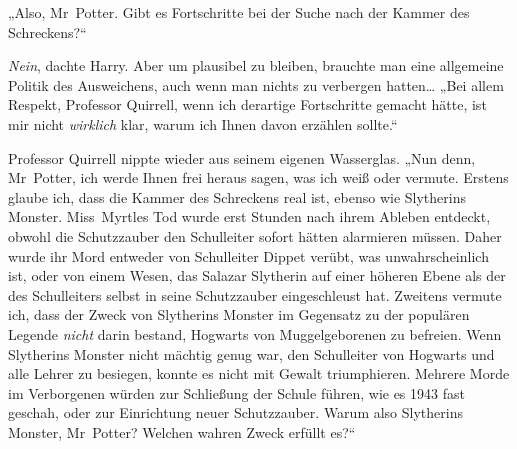 „Also, Mr~Potter. Gibt es Fortschritte bei der Suche nach der Kammer des Schreckens?“

\emph{Nein}, dachte Harry. Aber um plausibel zu bleiben, brauchte man eine allgemeine Politik des Ausweichens, auch wenn man nichts zu verbergen hatten… „Bei allem Respekt, Professor Quirrell, wenn ich derartige Fortschritte gemacht hätte, ist mir nicht \emph{wirklich} klar, warum ich Ihnen davon erzählen sollte.“

Professor Quirrell nippte wieder aus seinem eigenen Wasserglas. „Nun denn, Mr~Potter, ich werde Ihnen frei heraus sagen, was ich weiß oder vermute. Erstens glaube ich, dass die Kammer des Schreckens real ist, ebenso wie Slytherins Monster. Miss~Myrtles Tod wurde erst Stunden nach ihrem Ableben entdeckt, obwohl die Schutzzauber den Schulleiter sofort hätten alarmieren müssen. Daher wurde ihr Mord entweder von Schulleiter Dippet verübt, was unwahrscheinlich ist, oder von einem Wesen, das Salazar Slytherin auf einer höheren Ebene als der des Schulleiters selbst in seine Schutzzauber eingeschleust hat. Zweitens vermute ich, dass der Zweck von Slytherins Monster im Gegensatz zu der populären Legende \emph{nicht} darin bestand, Hogwarts von Muggelgeborenen zu befreien. Wenn Slytherins Monster nicht mächtig genug war, den Schulleiter von Hogwarts und alle Lehrer zu besiegen, konnte es nicht mit Gewalt triumphieren. Mehrere Morde im Verborgenen würden zur Schließung der Schule führen, wie es 1943 fast geschah, oder zur Einrichtung neuer Schutzzauber. Warum also Slytherins Monster, Mr~Potter? Welchen wahren Zweck erfüllt es?“

